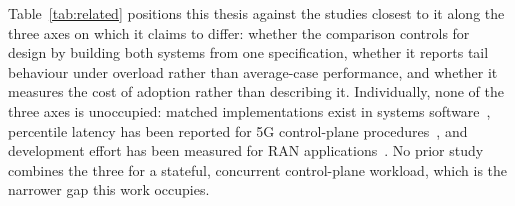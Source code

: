 \documentclass[english,twoside,openright,a4paper,censored,csm,software-track-2020]{HYthesisML}
\begin{document}
Table~\ref{tab:related} positions this thesis against the studies closest to it along the
three axes on which it claims to differ: whether the comparison controls for design by
building both systems from one specification, whether it reports tail behaviour under overload
rather than average-case performance, and whether it measures the cost of adoption rather than
describing it. Individually, none of the three axes is unoccupied: matched implementations
exist in systems software~\cite{emmerich2019drivers,li2021ipc,narayanan2020redleaf},
percentile latency has been reported for 5G control-plane
procedures~\cite{arvidsson2025async}, and development effort has been measured for RAN
applications~\cite{karlback2021ran}. No prior study combines the three for a stateful,
concurrent control-plane workload, which is the narrower gap this work occupies.
\end{document}
